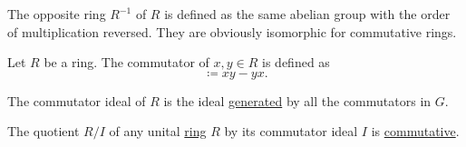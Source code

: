 \begin{definition}\label{def:opposite_ring}
  The opposite ring \( R^{-1} \) of \( R \) is defined as the same abelian group with the order of multiplication reversed. They are obviously isomorphic for commutative rings.
\end{definition}

\begin{definition}\label{def:ring_commutator}
  Let \( R \) be a ring. The commutator of \( x, y \in R \) is defined as
  \begin{equation*}
    [x, y] \coloneqq xy - yx.
  \end{equation*}

  The commutator ideal of \( R \) is the ideal \hyperref[def:generated_ring_ideal]{generated} by all the commutators in \( G \).
\end{definition}

\begin{proposition}\label{thm:quotient_by_commutator_ideal}
  The quotient \( R / I \) of any unital \hyperref[def:semiring/unital_ring]{ring} \( R \) by its commutator ideal \( I \) is \hyperref[def:semiring/commutative_ring]{commutative}.
\end{proposition}
